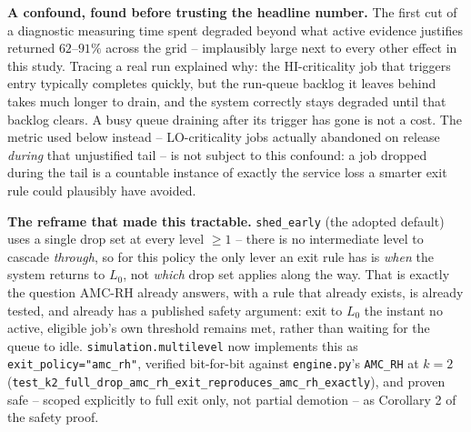 \textbf{A confound, found before trusting the headline number.} The first cut
of a diagnostic measuring time spent degraded beyond what active evidence
justifies returned $62$--$91\%$ across the grid -- implausibly large next to
every other effect in this study. Tracing a real run explained why: the
HI-criticality job that triggers entry typically completes quickly, but the
run-queue backlog it leaves behind takes much longer to drain, and the system
correctly stays degraded until that backlog clears. A busy queue draining
after its trigger has gone is not a cost. The metric used below instead --
LO-criticality jobs actually abandoned on release \emph{during} that
unjustified tail -- is not subject to this confound: a job dropped during the
tail is a countable instance of exactly the service loss a smarter exit rule
could plausibly have avoided.

\textbf{The reframe that made this tractable.} \texttt{shed\_early} (the
adopted default) uses a single drop set at every level $\geq 1$ -- there is no
intermediate level to cascade \emph{through}, so for this policy the only
lever an exit rule has is \emph{when} the system returns to $L_0$, not
\emph{which} drop set applies along the way. That is exactly the question
AMC-RH already answers, with a rule that already exists, is already tested,
and already has a published safety argument: exit to $L_0$ the instant no
active, eligible job's own threshold remains met, rather than waiting for the
queue to idle. \texttt{simulation.multilevel} now implements this as
\texttt{exit\_policy="amc\_rh"}, verified bit-for-bit against \texttt{engine.py}'s
\texttt{AMC\_RH} at $k=2$
(\texttt{test\_k2\_full\_drop\_amc\_rh\_exit\_reproduces\_amc\_rh\_exactly}), and
proven safe -- scoped explicitly to full exit only, not partial demotion -- as
Corollary 2 of the safety proof.

